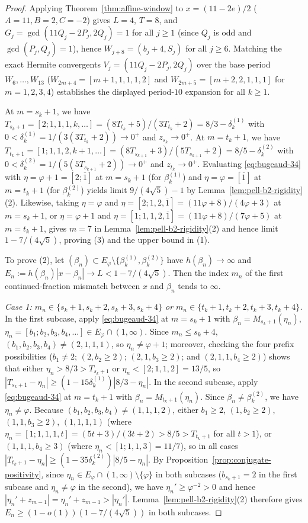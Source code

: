 \documentclass[11pt]{amsart}
\theoremstyle{definition}
\theoremstyle{remark}
\numberwithin{equation}{section}
\begin{document}
\begin{proof}
Applying Theorem~\ref{thm:affine-window} to $x=(11-2e)/2$ ($A=11,B=2,C=-2$)
gives $L=4$, $T=8$, and $G_j=\gcd(11Q_j-2P_j,2Q_j)=1$ for all $j\ge1$
(since $Q_j$ is odd and $\gcd(P_j,Q_j)=1$), hence
$W_{j+8}=(b_j+4,S_j)$ for all $j\ge6$. Matching the exact Hermite
convergents $V_j=(11Q_j-2P_j,2Q_j)$ over the base period $W_6,\ldots,W_{13}$
($W_{2m+4}=[m+1,1,1,1,2]$ and $W_{2m+5}=[m+2,2,1,1,1]$ for $m=1,2,3,4$)
establishes the displayed period-$10$ expansion for all $k\ge1$.

At $m=s_k+1$, we have
$T_{s_k+1}=[2;1,1,1,k,\ldots]=(8T_{t_k}+5)/(3T_{t_k}+2)=8/3-\delta_k^{(1)}$
with $0<\delta_k^{(1)}=1/(3(3T_{t_k}+2))\to0^+$ and $z_{s_k}\to0^+$.
At $m=t_k+1$, we have
$T_{t_k+1}=[1;1,1,2,k+1,\ldots]=(8T_{s_{k+1}}+3)/(5T_{s_{k+1}}+2)=8/5-\delta_k^{(2)}$
with $0<\delta_k^{(2)}=1/(5(5T_{s_{k+1}}+2))\to0^+$ and $z_{t_k}\to0^+$.
Evaluating \eqref{eq:bugeaud-34} with $\eta=\varphi+1=[2;\overline1]$ at
$m=s_k+1$ (for $\beta_k^{(1)}$) and $\eta=\varphi=[\overline1]$ at
$m=t_k+1$ (for $\beta_k^{(2)}$) yields limit $9/(4\sqrt5)-1$ by
Lemma~\ref{lem:pell-b2-rigidity}(2). Likewise, taking $\eta=\varphi$ and
$\eta=[2;1,2,\overline1]=(11\varphi+8)/(4\varphi+3)$ at $m=s_k+1$, or
$\eta=\varphi+1$ and $\eta=[1;1,1,2,\overline1]=(11\varphi+8)/(7\varphi+5)$
at $m=t_k+1$, gives $m=7$ in Lemma~\ref{lem:pell-b2-rigidity}(2) and
hence limit $1-7/(4\sqrt5)$, proving (3) and the upper bound in (1).

To prove (2), let $(\beta_n)\subset E_\varphi\setminus\{\beta_k^{(1)},\beta_k^{(2)}\}$
have $h(\beta_n)\to\infty$ and $E_n:=h(\beta_n)|x-\beta_n|\to L<1-7/(4\sqrt5)$.
Then the index $m_n$ of the first continued-fraction mismatch between
$x$ and $\beta_n$ tends to $\infty$.

\emph{Case 1: $m_n\in\{s_k+1,s_k+2,s_k+3,s_k+4\}$ or
$m_n\in\{t_k+1,t_k+2,t_k+3,t_k+4\}$.}
In the first subcase, apply \eqref{eq:bugeaud-34} at $m=s_k+1$ with
$\beta_n=M_{s_k+1}(\eta_n)$, $\eta_n=[b_1;b_2,b_3,b_4,\ldots]\in E_\varphi\cap(1,\infty)$.
Since $m_n\le s_k+4$, $(b_1,b_2,b_3,b_4)\ne(2,1,1,1)$, so
$\eta_n\ne\varphi+1$; moreover, checking the four prefix possibilities
($b_1\ne2$; $(2,b_2\ge2)$; $(2,1,b_3\ge2)$; and $(2,1,1,b_4\ge2)$) shows
that either $\eta_n>8/3>T_{s_k+1}$ or $\eta_n<[2;1,1,2]=13/5$, so
$|T_{s_k+1}-\eta_n|\ge(1-15\delta_k^{(1)})|8/3-\eta_n|$. In the second
subcase, apply \eqref{eq:bugeaud-34} at $m=t_k+1$ with
$\beta_n=M_{t_k+1}(\eta_n)$. Since $\beta_n\ne\beta_k^{(2)}$, we have
$\eta_n\ne\varphi$. Because $(b_1,b_2,b_3,b_4)\ne(1,1,1,2)$, either
$b_1\ge2$, $(1,b_2\ge2)$, $(1,1,b_3\ge2)$, $(1,1,1,1)$ (where
$\eta_n=[1;1,1,1,t]=(5t+3)/(3t+2)>8/5>T_{t_k+1}$ for all $t>1$), or
$(1,1,1,b_4\ge3)$ (where $\eta_n<[1;1,1,3]=11/7$), so in all cases
$|T_{t_k+1}-\eta_n|\ge(1-35\delta_k^{(2)})|8/5-\eta_n|$. By
Proposition~\ref{prop:conjugate-positivity}, since
$\eta_n\in E_\varphi\cap(1,\infty)\setminus\{\varphi\}$ in both subcases
($b_{s_k+1}=2$ in the first subcase and $\eta_n\ne\varphi$ in the second),
we have $\eta_n'\ge\varphi^{-2}>0$ and hence
$|\eta_n'+z_{m-1}|=\eta_n'+z_{m-1}>|\eta_n'|$.
Lemma~\ref{lem:pell-b2-rigidity}(2)
therefore gives $E_n\ge(1-o(1))(1-7/(4\sqrt5))$ in both subcases.


\end{proof}
\end{document}
